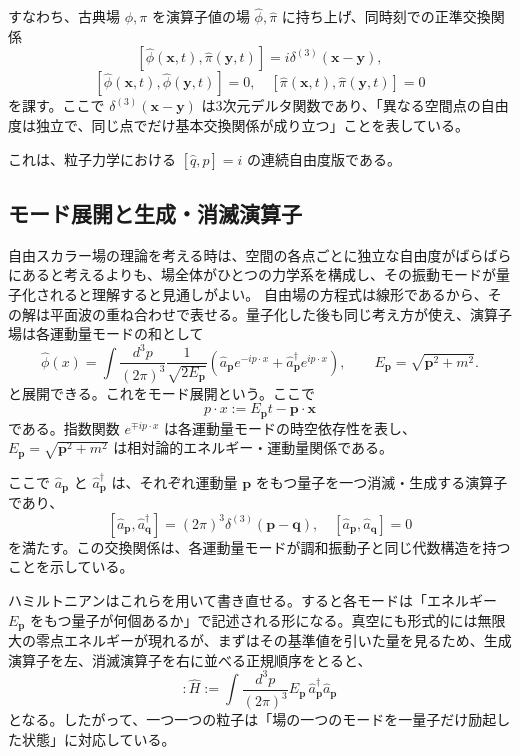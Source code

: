 すなわち、古典場 $\phi,\pi$ を演算子値の場 $\hat{\phi},\hat{\pi}$ に持ち上げ、同時刻での正準交換関係
\[
[\hat{\phi}(\mathbf{x},t), \hat{\pi}(\mathbf{y},t)] = i\delta^{(3)}(\mathbf{x}-\mathbf{y}),
\]
\[
[\hat{\phi}(\mathbf{x},t), \hat{\phi}(\mathbf{y},t)] = 0, \quad
[\hat{\pi}(\mathbf{x},t), \hat{\pi}(\mathbf{y},t)] = 0
\]
を課す。ここで $\delta^{(3)}(\mathbf{x}-\mathbf{y})$ は3次元デルタ関数であり、「異なる空間点の自由度は独立で、同じ点でだけ基本交換関係が成り立つ」ことを表している。

これは、粒子力学における $[\hat{q},\hat{p}] = i$ の連続自由度版である。

\subsection{モード展開と生成・消滅演算子}
自由スカラー場の理論を考える時は、空間の各点ごとに独立な自由度がばらばらにあると考えるよりも、場全体がひとつの力学系を構成し、その振動モードが量子化されると理解すると見通しがよい。
自由場の方程式は線形であるから、その解は平面波の重ね合わせで表せる。量子化した後も同じ考え方が使え、演算子場は各運動量モードの和として
\[
\hat{\phi}(x) =
\int \frac{d^3p}{(2\pi)^3}\frac{1}{\sqrt{2E_{\mathbf{p}}}}
\left(
\hat{a}_{\mathbf{p}} e^{-ip\cdot x}
+ \hat{a}_{\mathbf{p}}^\dagger e^{ip\cdot x}
\right),
\qquad
E_{\mathbf{p}} = \sqrt{\mathbf{p}^2 + m^2}.
\]
と展開できる。これをモード展開という。ここで
\[
p\cdot x := E_{\mathbf{p}}t-\mathbf{p}\cdot\mathbf{x}
\]
である。指数関数 $e^{\mp ip\cdot x}$ は各運動量モードの時空依存性を表し、$E_{\mathbf{p}} = \sqrt{\mathbf{p}^2 + m^2}$ は相対論的エネルギー・運動量関係である。

ここで $\hat{a}_{\mathbf{p}}$ と $\hat{a}_{\mathbf{p}}^\dagger$ は、それぞれ運動量 $\mathbf{p}$ をもつ量子を一つ消滅・生成する演算子であり、
\[
[\hat{a}_{\mathbf{p}}, \hat{a}_{\mathbf{q}}^\dagger] = (2\pi)^3 \delta^{(3)}(\mathbf{p}-\mathbf{q}),
\quad
[\hat{a}_{\mathbf{p}}, \hat{a}_{\mathbf{q}}] = 0
\]
を満たす。この交換関係は、各運動量モードが調和振動子と同じ代数構造を持つことを示している。

ハミルトニアンはこれらを用いて書き直せる。すると各モードは「エネルギー $E_{\mathbf{p}}$ をもつ量子が何個あるか」で記述される形になる。真空にも形式的には無限大の零点エネルギーが現れるが、まずはその基準値を引いた量を見るため、生成演算子を左、消滅演算子を右に並べる正規順序をとると、
\[
:\hat{H}:=
\int \frac{d^3p}{(2\pi)^3} E_{\mathbf{p}} \,
\hat{a}_{\mathbf{p}}^\dagger \hat{a}_{\mathbf{p}}
\]
となる。したがって、一つ一つの粒子は「場の一つのモードを一量子だけ励起した状態」に対応している。

